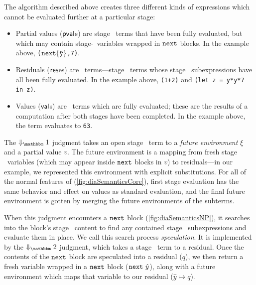 
The algorithm described above creates three different kinds of expressions which
cannot be evaluated further at a particular stage:
\begin{itemize}
\item 
Partial values ($\mathsf{pval}$s) are stage \bbone\ terms that have been fully evaluated, 
but which may contain stage-\bbtwo\ variables wrapped in ${\tt next}$ blocks. 
In the example above, 
\verb|(|${\tt next} \{\mathtt{\hat y}\}$\verb|,7)|.

\item Residuals ($\mathsf{res}$es) are \langTwo\ terms---stage \bbtwo\ terms whose
stage \bbone\ subexpressions have all been fully evaluated. In the example
above,
\verb|(1+2)| and \verb|(let z = y*y*7 in z)|.

\item Values ($\mathsf{val}$s) are \langTwo\ terms which are fully evaluated; these
are the results of a computation after both stages have been completed. In the
example above, the term evaluates to \verb|63|.
\end{itemize}


The $\redonesym$ judgment takes an open stage \bbone\ term to a {\em future
environment} $\xi$ and a partial value $v$.  The future environment is a mapping
from fresh stage \bbtwo\ variables (which may appear inside ${\tt next}$ blocks in
$v$) to residuals---in our example, we represented this environment with
explicit substitutions. For all of the normal features of \lang
(\ref{fig:diaSemanticsCore}), first stage evaluation has the same behavior and
effect on values as standard evaluation, and the final future environment is
gotten by merging the future environments of the subterms.

When this judgment encounters a ${\tt next}$ block (\ref{fig:diaSemanticsNP}), it
searches into the block's stage \bbtwo\ content to find any contained stage
\bbone\ subexpressions and evaluate them in place.  We call this search process
\emph{speculation}. It is implemented by the $\redtwosym$ judgment, which takes
a stage \bbtwo\ term to a residual.  Once the contents of the ${\tt next}$ block are
speculated into a residual ($q$), we then return a fresh variable wrapped in a
${\tt next}$ block (${\tt next}~\hat y$), along with a future environment which maps that
variable to our residual ($\hat y \mapsto q$).


